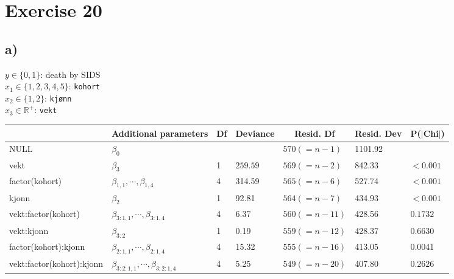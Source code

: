 \section{Exercise 20}
\subsection{a)}
$y \in \{0,1\}$: death by SIDS\\
$x_{1} \in \{1,2,3,4,5\}$: \texttt{kohort}\\
$x_{2} \in \{1,2\}$: \texttt{kj{\o}nn}\\
$x_{3} \in \mathbb{R}^{+}$: \texttt{vekt}\\

\begin{table}[ht]
\centering
\begin{tabular}{l|l|l|l|l|l|l|}
\cline{2-7}
\multicolumn{1}{c|}{} & Additional parameters & \multicolumn{1}{c|}{Df} & \multicolumn{1}{c|}{Deviance} & \multicolumn{1}{c|}{Resid. Df} & \multicolumn{1}{c|}{Resid. Dev} & P($\vert$Chi$\vert$) \\ \hline
%
\multicolumn{1}{|l|}{NULL} & $\beta_{0}$ & & & {\color[HTML]{3531FF} $570 (=n-1)$} & {\color[HTML]{3531FF} 1101.92} & \\ \hline
\multicolumn{1}{|l|}{vekt} & $\beta_{3}$ & 1 & $259.59$ & {\color[HTML]{3531FF} $569 (=n-2)$} & {\color[HTML]{3531FF} 842.33} & $< 0.001$ \\ \hline
\multicolumn{1}{|l|}{factor(kohort)} & $\beta_{1,1}, \cdots, \beta_{1,4}$ & 4 & 314.59 & $565 (=n-6)$ & {\color[HTML]{3531FF} 527.74} & $< 0.001$ \\ \hline
\multicolumn{1}{|l|}{kjonn} & $\beta_{2}$ & 1 & 92.81 & $564 (=n-7)$ & {\color[HTML]{3531FF} 434.93} & $< 0.001$ \\ \hline
\multicolumn{1}{|l|}{vekt:factor(kohort)} & $\beta_{3:1,1}, \cdots, \beta_{3:1,4}$ & 4 & 6.37 & $560 (=n-11)$ & {\color[HTML]{3531FF} 428.56} & $0.1732$ \\ \hline
\multicolumn{1}{|l|}{vekt:kjonn} & $\beta_{3:2}$ & 1 & 0.19 & $559 (=n-12)$ & {\color[HTML]{3531FF} 428.37} & $0.6630$ \\ \hline
\multicolumn{1}{|l|}{factor(kohort):kjonn} & $\beta_{2:1,1}, \cdots, \beta_{2:1,4}$ & 4 & 15.32 & $555 (=n-16)$ & {\color[HTML]{3531FF} 413.05} & {\color[HTML]{3531FF} 0.0041} \\ \hline
\multicolumn{1}{|l|}{vekt:factor(kohort):kjonn} & $\beta_{3:2:1,1}, \cdots, \beta_{3:2:1,4}$ & 4 & 5.25 & $549 (=n-20)$ & {\color[HTML]{3531FF} 407.80} & $0.2626$\\ \hline
\end{tabular}
\end{table}

